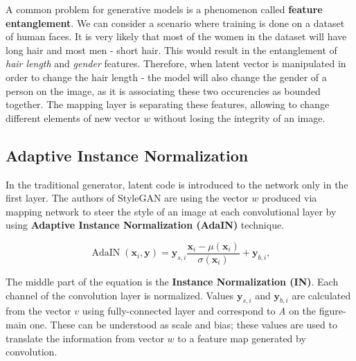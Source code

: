 \documentclass[12pt,a4paper,openany]{book}
\begin{document}
A common problem for generative models is a phenomenon called \textbf{feature entanglement}. We can consider a scenario where training is done on a dataset of human faces. It is very likely that most of the women in the dataset will have long hair and most men - short hair. This would result in the entanglement of \textit{hair length} and \textit{gender} features. Therefore, when latent vector is manipulated in order to change the hair length - the model will also change the gender of a person on the image, as it is associating these two occurencies as bounded together. The mapping layer is separating these features, allowing to change different elements of new vector $w$ without losing the integrity of an image.

\subsection{Adaptive Instance Normalization}


In the traditional generator, latent code is introduced to the network only in the first layer. The authors of StyleGAN are using the vector $w$ produced via mapping network to steer the style of an image at each convolutional layer by using \textbf{Adaptive Instance Normalization (AdaIN)} technique.

\begin{equation}
\operatorname{AdaIN}\left(\mathbf{x}_{i}, \mathbf{y}\right)=\mathbf{y}_{s, i} \frac{\mathbf{x}_{i}-\mu\left(\mathbf{x}_{i}\right)}{\sigma\left(\mathbf{x}_{i}\right)}+\mathbf{y}_{b, i},
\end{equation}


The middle part of the equation is the \textbf{Instance Normalization (IN)}. Each channel of the convolution layer is normalized. Values $\textbf{y}_{s,i}$ and $\textbf{y}_{b,i}$ are calculated from the vector $v$ using fully-connected layer and correspond to \textit{A} on the figure-main one. These can be understood as scale and bias; these values are used to translate the information from vector $w$ to a feature map generated by convolution.
\end{document}
